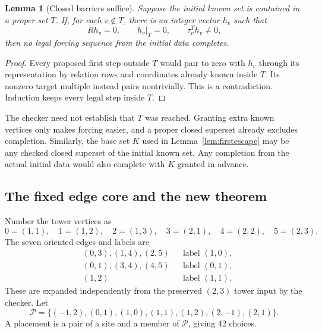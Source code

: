 \documentclass[11pt,letterpaper]{article}
\newtheorem{lemma}[theorem]{Lemma}
\theoremstyle{definition}
\theoremstyle{remark}\newtheorem{remark}[theorem]{Remark}
\begin{document}
\begin{lemma}[Closed barriers suffice]\label{lem:closedbarrier}
Suppose the initial known set is contained in a proper set $T$. If, for each $v\notin T$, there is an integer vector $h_v$ such that
\[
R h_v=0,\qquad h_v|_T=0,\qquad \tau_v^Th_v\ne0,
\]
then no legal forcing sequence from the initial data completes.
\end{lemma}
\begin{proof}
Every proposed first step outside $T$ would pair to zero with $h_v$ through its representation by relation rows and coordinates already known inside $T$. Its nonzero target multiple instead pairs nontrivially. This is a contradiction. Induction keeps every legal step inside $T$.
\end{proof}
The checker need not establish that $T$ was reached. Granting extra known vertices only makes forcing easier, and a proper closed superset already excludes completion. Similarly, the base set $K$ used in Lemma~\ref{lem:firstescape} may be any checked closed superset of the initial known set. Any completion from the actual initial data would also complete with $K$ granted in advance.

\subsection{The fixed edge core and the new theorem}
Number the tower vertices as
\[
0=(1,1),\quad1=(1,2),\quad2=(1,3),\quad
3=(2,1),\quad4=(2,2),\quad5=(2,3).
\]
The seven oriented edges and labels are
\begin{align*}
&(0,3),(1,4),(2,5) &&\text{label }(1,0),\\
&(0,1),(3,4),(4,5) &&\text{label }(0,1),\\
&(1,2) &&\text{label }(1,1).
\end{align*}
These are expanded independently from the preserved $(2,3)$ tower input by the checker. Let
\begin{equation}\label{eq:pool}
\mathcal P=\{(-1,2),(0,1),(1,0),(1,1),(1,2),(2,-1),(2,1)\}.
\end{equation}
A placement is a pair of a site and a member of $\mathcal P$, giving 42 choices.
\end{document}
